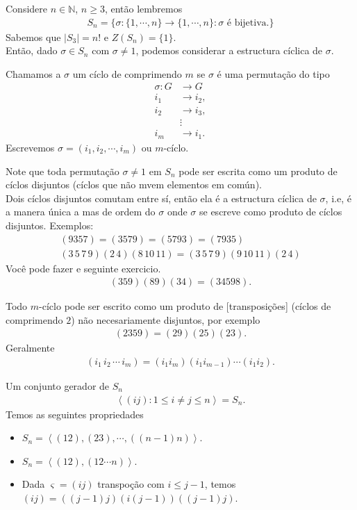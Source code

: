 Considere $n\in\mathbb{N}$, $n\geq 3$, então lembremos
\begin{align*}
  S_n=\{\sigma:\{1,\cdots,n\}\to\{1,\cdots,n\}:\sigma\text{ é bijetiva.}\}
\end{align*}
Sabemos que $|S_3|=n!$ e $Z(S_n)=\{1\}$.\\
Então, dado  $\sigma\in S_n$ com $\sigma\neq 1$, podemos considerar a estructura cíclica de $\sigma$.
\begin{definition}
  Chamamos a $\sigma$ um cíclo de comprimendo $m$ se $\sigma$ é uma permutação do tipo
  \begin{align*}
    \sigma:G&\to G\\
    i_1&\to i_2,\\
    i_2&\to i_3,\\
    &\vdots\\
    i_m&\to i_1.
  \end{align*}
  Escrevemos $\sigma=(i_1,i_2,\cdots,i_m)$ ou $m$-cíclo. 
\end{definition}
Note que toda permutação $\sigma\neq 1$ em $S_n$ pode ser escrita como um produto de cíclos disjuntos (cíclos que não mvem elementos em común).\\
Dois cíclos disjuntos comutam entre sí, então ela é a estructura cíclica de $\sigma$, i.e, é a manera única a mas de ordem do $\sigma$ onde $\sigma$ se escreve como produto de cíclos disjuntos.
Exemplos: 
\begin{align*}
  (9357)=(3579)=(5793)=(7935)\\
  (3\,5\,7\,9)(2\,4)(8\, 10\, 11)=(3\, 5\, 7\, 9)(9\, 10\, 11)(2\, 4)
\end{align*}
Você pode fazer e seguinte exercicio.
\begin{align*}
  (359)(89)(34)=(34598).
\end{align*}
\begin{note}
  Todo $m$-cíclo pode ser escrito como um produto de [transposições] (cíclos de comprimendo $2$) não necesariamente disjuntos, por exemplo
  \begin{align*}
    (2359)=(29)(25)(23).
  \end{align*}
  Geralmente 
  \begin{align*}
    (i_1\, i_2\, \cdots\, i_m)=(i_1i_m)(i_1i_{m-1})\cdots (i_1i_2).
  \end{align*}
\end{note}
\begin{note}[Propriedades de $S_n$]
  Um conjunto gerador de $S_n$
  \begin{align*}
    \left\langle (ij):1\leq i\neq j\leq n \right\rangle=S_n.
  \end{align*}
  Temos as seguintes propriedades
  \begin{itemize}
    \item $S_n=\left\langle (12),(23),\cdots,((n-1) n) \right\rangle$.
    \item $S_n=\left\langle (12),(12\cdots n) \right\rangle$.
    \item Dada $\varsigma=(ij)$ transpoção com $i\leq j-1$, temos $(ij)=((j-1)j)(i(j-1))((j-1)j)$. 
  \end{itemize}
\end{note}
